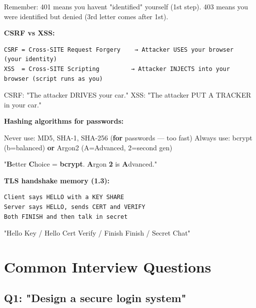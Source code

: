 \documentclass[11pt]{article}
\newenvironment{Shaded}{\begin{snugshade}}{\end{snugshade}}
\newcommand{\ControlFlowTok}[1]{\textcolor[rgb]{0.99,0.74,0.29}{\textbf{#1}}}
\newcommand{\DecValTok}[1]{\textcolor[rgb]{0.96,0.45,0.00}{#1}}
\newcommand{\KeywordTok}[1]{\textcolor[rgb]{0.81,0.81,0.76}{\textbf{#1}}}
\newcommand{\NormalTok}[1]{\textcolor[rgb]{0.81,0.81,0.76}{#1}}
\newcommand{\OperatorTok}[1]{\textcolor[rgb]{0.81,0.81,0.76}{#1}}
\begin{document}
Remember: 401 means you haven\textquotesingle t "identified" yourself (1st step). 403 means you were identified but denied (3rd letter comes after 1st).

\textbf{CSRF vs XSS:}

\setcodelang{}

\begin{verbatim}
CSRF = Cross-SITE Request Forgery    → Attacker USES your browser (your identity)
XSS  = Cross-SITE Scripting         → Attacker INJECTS into your browser (script runs as you)
\end{verbatim}

CSRF: "The attacker DRIVES your car." XSS: "The attacker PUT A TRACKER in your car."

\textbf{Hashing algorithms for passwords:}


\begin{Shaded}
\begin{Highlighting}[]
\NormalTok{Never use: MD5, SHA}\OperatorTok{{-}}\DecValTok{1}\NormalTok{, SHA}\OperatorTok{{-}}\DecValTok{256}\NormalTok{ (}\ControlFlowTok{for}\NormalTok{ passwords — too fast)}
\NormalTok{Always use: bcrypt (b}\OperatorTok{=}\NormalTok{balanced) }\KeywordTok{or}\NormalTok{ Argon2 (A}\OperatorTok{=}\NormalTok{Advanced, }\DecValTok{2}\OperatorTok{=}\NormalTok{second gen)}
\end{Highlighting}
\end{Shaded}

"\textbf{B}etter \textbf{C}hoice = \textbf{bcrypt}. \textbf{A}rgon \textbf{2} is \textbf{A}dvanced."

\textbf{TLS handshake memory (1.3):}

\setcodelang{}

\begin{verbatim}
Client says HELLO with a KEY SHARE
Server says HELLO, sends CERT and VERIFY
Both FINISH and then talk in secret
\end{verbatim}

"Hello Key / Hello Cert Verify / Finish Finish / Secret Chat"

\section{Common Interview Questions}\label{common-interview-questions}

\subsection{Q1: "Design a secure login system"}\label{q1-design-a-secure-login-system}
\end{document}
